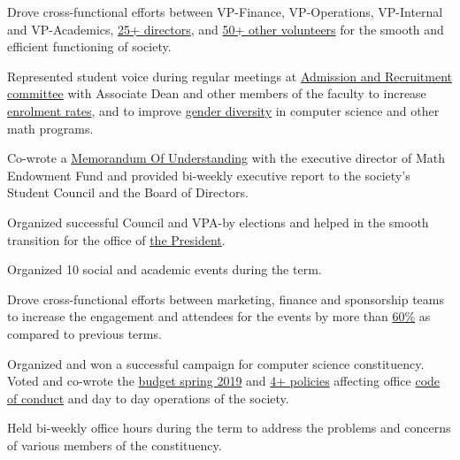 \documentclass[]{deedy-resume-openfont}
\begin{document}
\begin{minipage}[t]{0.66\textwidth}
\begin{tightemize}
\item Drove cross-functional efforts between VP-Finance, VP-Operations, VP-Internal and  VP-Academics, \underline{25+ directors}, and \underline{50+ other volunteers} for the smooth and efficient functioning of society.
\item Represented student voice during regular meetings at \underline{Admission and Recruitment committee} with Associate Dean and other members of the faculty to increase \underline{enrolment rates}, and to improve \underline{gender diversity} in computer science and other math programs.
\item Co-wrote a \underline{Memorandum Of Understanding} with the executive director of Math Endowment Fund and provided bi-weekly executive report to the society's Student Council and the Board of Directors. 
\item Organized successful Council and VPA-by elections and helped in the smooth transition for the office of \underline{the President}.
\end{tightemize}
\sectionsep

\begin{tightemize}
\item Organized 10 social and academic events during the term.
\item Drove cross-functional efforts between marketing, finance and sponsorship teams to increase the engagement and attendees for the events by more than \underline{60\%} as compared to previous terms.
\end{tightemize}
\sectionsep

\begin{tightemize}
\item Organized and won a successful campaign for computer science constituency. Voted and co-wrote the \underline{budget spring 2019} and \underline{4+ policies} affecting office \underline{code of conduct} and day to day operations of the society.
\item Held bi-weekly office hours during the term to address the problems and concerns of various members of the constituency.
\end{tightemize}
\sectionsep

\end{minipage} 
\end{document}
